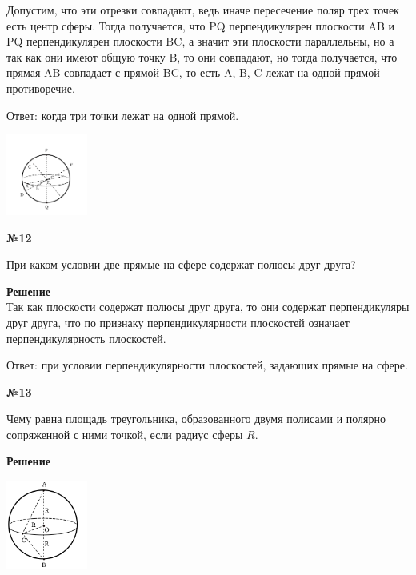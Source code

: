     Допустим, что эти отрезки совпадают, ведь иначе пересечение поляр трех точек есть центр сферы.
    Тогда получается, что PQ перпендикулярен плоскости AB и PQ перпендикулярен плоскости BC,
    а значит эти плоскости параллельны, но а так как они имеют общую точку B, то они совпадают,
    но тогда получается, что прямая AB совпадает с прямой BC, то есть A, B, C лежат на одной прямой - противоречие.

    Ответ: когда три точки лежат на одной прямой.
    \begin{center}
        \includegraphics[width=0.2\textwidth]{images/Frame 71}\\
    \end{center}

    \begin{center}
        \textbf{№12}
    \end{center}

    При каком условии две прямые на сфере содержат полюсы друг друга?

    \textbf{Решение}\\

    Так как плоскости содержат полюсы друг друга, то они содержат перпендикуляры друг друга,
    что по признаку перпендикулярности плоскостей означает перпендикулярность плоскостей.

    Ответ: при условии перпендикулярности плоскостей, задающих прямые на сфере.

    \begin{center}
        \textbf{№13}
    \end{center}

    Чему равна площадь треугольника, образованного двумя полисами и полярно сопряженной с ними точкой,
    если радиус сферы $R$.

    \textbf{Решение}\\

    \begin{center}
        \includegraphics[width=0.2\textwidth]{images/img6}\\
    \end{center}

